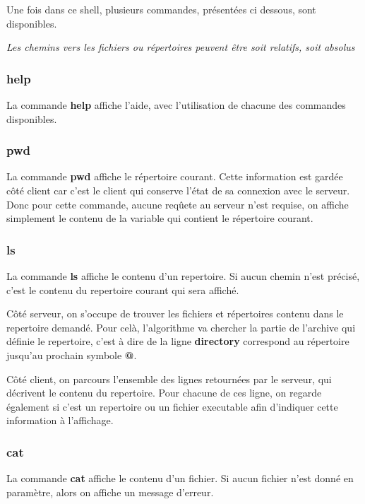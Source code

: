 \documentclass[titlepage]{article}
\begin{document}
	Une fois dans ce shell, plusieurs commandes, présentées ci dessous, sont disponibles.

	\textit{Les chemins vers les fichiers ou répertoires peuvent être soit relatifs, soit absolus}

	\subsubsection{help}

	La commande \textbf{help} affiche l'aide, avec l'utilisation de chacune des commandes disponibles.

	\subsubsection{pwd}

	La commande \textbf{pwd} affiche le répertoire courant. Cette information est gardée côté client car c'est le client qui conserve l'état de sa connexion avec le serveur. Donc pour cette commande, aucune reqûete au serveur n'est requise, on affiche simplement le contenu de la variable qui contient le répertoire courant.

	\subsubsection{ls}

	La commande \textbf{ls} affiche le contenu d'un repertoire. Si aucun chemin n'est précisé, c'est le contenu du repertoire courant qui sera affiché.

	Côté serveur, on s'occupe de trouver les fichiers et répertoires contenu dans le repertoire demandé. Pour celà, l'algorithme va chercher la partie de l'archive qui définie le repertoire, c'est à dire de la ligne \textbf{directory} correspond au répertoire jusqu'au prochain symbole \textbf{@}. 

	Côté client, on parcours l'ensemble des lignes retournées par le serveur, qui décrivent le contenu du repertoire. Pour chacune de ces ligne, on regarde également si c'est un repertoire ou un fichier executable afin d'indiquer cette information à l'affichage.

	\subsubsection{cat}

	La commande \textbf{cat} affiche le contenu d'un fichier. Si aucun fichier n'est donné en paramètre, alors on affiche un message d'erreur.
\end{document}
